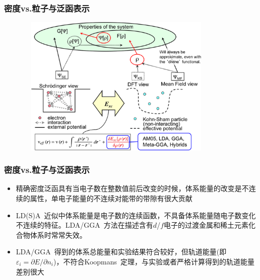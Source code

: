 {\frame
{
	\frametitle{密度\textrm{vs.}粒子与泛函表示}
\begin{figure}[h!]
\vskip -10pt
\centering
\includegraphics[height=2.65in,width=3.8in,viewport=0 0 362 275,clip]{Figures/DFT-particle-density.png}
\caption{\fontsize{6.0pt}{4.5pt}}%
\label{Schrodinger-equation-vs-Kohn-Sham-equation}
\end{figure}
}

\frame
{
	\frametitle{密度\textrm{vs.}粒子与泛函表示}
\begin{itemize}
\setlength{\itemsep}{12pt}
	\item 精确密度泛函具有当电子数在整数值前后改变的时候，体系能量的改变是不连续的属性，单电子能量的不连续对能带的带隙有很大贡献
	 \item\textrm{LD(S)A~}近似中体系能量是电子数的连续函数，不具备体系能量随电子数变化不连续的特征。\textrm{LDA/GGA~}方法在描述含有$d$/$f$电子的过渡金属和稀土元素化合物体系时常常失效。
	\item \textrm{LDA}/\textrm{GGA~}得到的体系总能量和实验结果符合较好，但轨道能量(即$\varepsilon_i=\partial E/\partial n_i$)，不符合\textrm{Koopmans~}定理，与实验或者严格计算得到的轨道能量差别很大%
\end{itemize}
}

}
